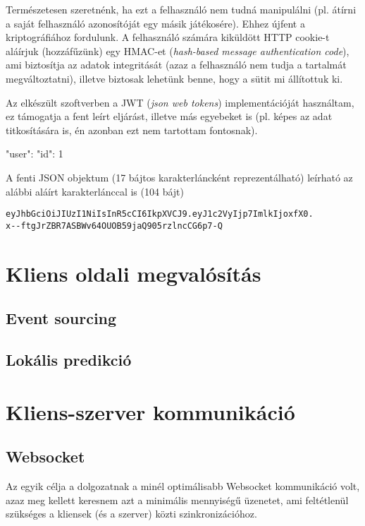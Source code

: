 Természetesen szeretnénk, ha ezt a felhasználó nem tudná manipulálni (pl. átírni
a saját felhasználó azonosítóját egy másik játékosére). Ehhez újfent a
kriptográfiához fordulunk. A felhasználó számára kiküldött HTTP cookie-t
aláírjuk (hozzáfűzünk) egy HMAC-et (\emph{hash-based message authentication
  code}), ami biztosítja az adatok integritását (azaz a felhasználó nem tudja a
tartalmát megváltoztatni), illetve biztosak lehetünk benne, hogy a sütit mi
állítottuk ki.

Az elkészült szoftverben a JWT (\emph{json web tokens}) implementációját
használtam, ez támogatja a fent leírt eljárást, illetve más egyebeket is (pl.
képes az adat titkosítására is, én azonban ezt nem tartottam fontosnak).

\begin{js}
{
  "user": {
    "id": 1
  }
}
\end{js}

A fenti JSON objektum (17 bájtos karakterláncként reprezentálható) leírható az
alábbi aláírt karakterlánccal is (104 bájt)

\begin{verbatim}
eyJhbGciOiJIUzI1NiIsInR5cCI6IkpXVCJ9.eyJ1c2VyIjp7ImlkIjoxfX0.
x--ftgJrZBR7ASBWv64OUOB59jaQ905rzlncCG6p7-Q
\end{verbatim}

\section{Kliens oldali megvalósítás}

\subsection{Event sourcing}

\subsection{Lokális predikció}

\section{Kliens-szerver kommunikáció}

\subsection{Websocket}

Az egyik célja a dolgozatnak a minél optimálisabb Websocket kommunikáció volt,
azaz meg kellett keresnem azt a minimális mennyiségű üzenetet, ami feltétlenül
szükséges a kliensek (és a szerver) közti szinkronizációhoz.

